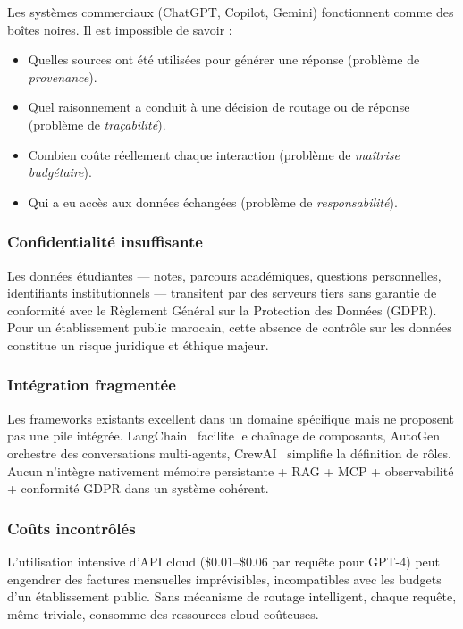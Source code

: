 \documentclass[12pt, a4paper]{article}
\newcommand{\acrshort}[1]{\MakeUppercase{#1}}
\begin{document}
Les systèmes commerciaux (ChatGPT, Copilot, Gemini) fonctionnent comme des boîtes noires. Il est impossible de savoir :
\begin{itemize}
  \item Quelles sources ont été utilisées pour générer une réponse (problème de \textit{provenance}).
  \item Quel raisonnement a conduit à une décision de routage ou de réponse (problème de \textit{traçabilité}).
  \item Combien coûte réellement chaque interaction (problème de \textit{maîtrise budgétaire}).
  \item Qui a eu accès aux données échangées (problème de \textit{responsabilité}).
\end{itemize}

\subsubsection{Confidentialité insuffisante}

Les données étudiantes — notes, parcours académiques, questions personnelles, identifiants institutionnels — transitent par des serveurs tiers sans garantie de conformité avec le Règlement Général sur la Protection des Données (\acrshort{gdpr}). Pour un établissement public marocain, cette absence de contrôle sur les données constitue un risque juridique et éthique majeur.

\subsubsection{Intégration fragmentée}

Les frameworks existants excellent dans un domaine spécifique mais ne proposent pas une pile intégrée. LangChain~\cite{langchain2023} facilite le chaînage de composants, AutoGen~\cite{wu2023autogen} orchestre des conversations multi-agents, CrewAI~\cite{crewai2024} simplifie la définition de rôles. Aucun n'intègre nativement mémoire persistante + \acrshort{rag} + \acrshort{mcp} + observabilité + conformité \acrshort{gdpr} dans un système cohérent.

\subsubsection{Coûts incontrôlés}

L'utilisation intensive d'API cloud (\$0.01--\$0.06 par requête pour GPT-4) peut engendrer des factures mensuelles imprévisibles, incompatibles avec les budgets d'un établissement public. Sans mécanisme de routage intelligent, chaque requête, même triviale, consomme des ressources cloud coûteuses.
\end{document}
